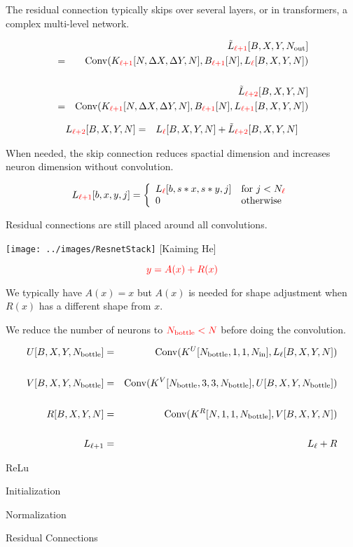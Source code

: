 {The residual connection typically skips over several layers, or in transformers, a complex multi-level network.

\vfill
\begin{eqnarray*}
& & \tilde{L}_{\color{red} \ell+1}[B,X,Y,N_{\mathrm{out}}] \\
& = & \mathrm{Conv}(K_{\color{red} \ell+1}[N,\Delta X,\Delta Y,N],B_{\color{red} \ell+1}[N],L_{\color{red} \ell}[B,X,Y,N]) \\
\\
& & \tilde{L}_{\color{red} \ell+2}[B,X,Y,N] \\
& = & \mathrm{Conv}(K_{\color{red} \ell+1}[N,\Delta X,\Delta Y,N],B_{\color{red} \ell+1}[N],L_{\color{red} \ell+1}[B,X,Y,N])
\end{eqnarray*}

\vfill
\begin{eqnarray*}
L_{\color{red} \ell+2}[B,X,Y,N] & = & L_{\color{red}\ell}[B,X,Y,N] + \tilde{L}_{\color{red} \ell+2}[B,X,Y,N]
\end{eqnarray*}



When needed, the skip connection reduces spactial dimension and increases neuron dimension without convolution.

\vfill

$$L_{\color{red} \ell+1}[b,x,y,j]  =  \left\{\begin{array}{ll} L_{\color{red} \ell}[b,s*x,s*y,j] & \mbox{for $j < N_{\color{red} \ell}$} \\ 0 & \mbox{otherwise} \end{array}\right.$$

\vfill
Residual connections are still placed around all convolutions.


\centerline{\texttt{[image: ../images/ResnetStack]} {\large [Kaiming He]}}



$${\color{red} y = A(x) + R(x)}$$

\vfill
We typically have $A(x)=x$ but $A(x)$ is needed for shape adjustment when $R(x)$ has a different shape from $x$.


We reduce the number of neurons to ${\color{red} N_{\mathrm{bottle}} < N}$ before doing the convolution.

{\huge
\begin{eqnarray*}
U[B,X,Y,N_{\mathrm{bottle}}] & = & \mathrm{Conv}(K^U[N_{\mathrm{bottle}},1,1,N_{\mathrm{in}}],L_\ell[B,X,Y,N]) \\
\\
V[B,X,Y,N_{\mathrm{bottle}}] & = & \mathrm{Conv}(K^V[N_{\mathrm{bottle}},3,3,N_\mathrm{bottle}],U[B,X,Y,N_{\mathrm{bottle}}]) \\
\\
R[B,X,Y,N] & = & \mathrm{Conv}(K^R[N,1,1,N_{\mathrm{bottle}}],V[B,X,Y,N]) \\
\\
L_{ \ell+1} & = & L_\ell + R
\end{eqnarray*}
}

  \centerline{ReLu}
  \vfill
  \centerline{Initialization}
  \vfill
  \centerline{Normalization}
  \vfill
  \centerline{Residual Connections}


}

